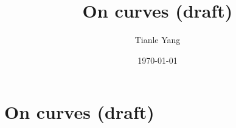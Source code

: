 \documentclass{noteformyself}
\title{On curves (draft)}
\author{Tianle Yang}
\date{\today}
\begin{document}
    \maketitle

    \section{On curves (draft)}


\end{document}
